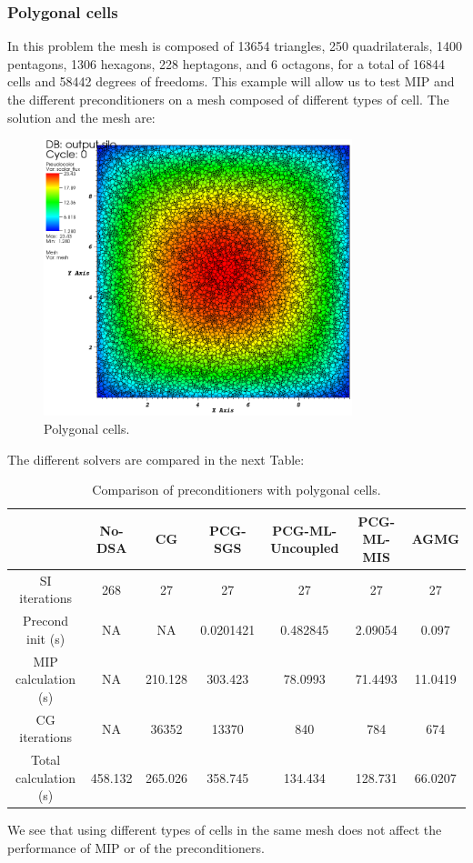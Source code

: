 \subsubsection{Polygonal cells}
In this problem the mesh is composed of 13654 triangles, 250 quadrilaterals,
1400 pentagons, 1306 hexagons, 228 heptagons, and 6 octagons, for a total of
16844 cells and 58442 degrees of freedoms. This example will allow us to test
MIP and the different preconditioners on a mesh composed of different types of
cell. The solution and the mesh are:
\begin{figure}[H]
\centering
\includegraphics[width=0.8\textwidth]{homog_poly_crop}
\caption{Polygonal cells.}
\end{figure}
The different solvers are compared in the next Table:
\begin{table}[H]
\begin{center}
\begin{tabular}{|c|c|c|c|c|c|c|}
\hline
 & No-DSA & CG & PCG-SGS & PCG-ML-Uncoupled & PCG-ML-MIS & AGMG\\
\hline
SI iterations & 268 & 27 & 27 & 27 & 27 & 27\\
Precond init (s) & NA & NA & 0.0201421 & 0.482845 & 2.09054 & 0.097\\
MIP calculation (s) & NA & 210.128 & 303.423 & 78.0993 & 71.4493 & 11.0419\\
CG iterations & NA & 36352 & 13370 & 840 & 784 & 674\\
Total calculation (s) & 458.132 & 265.026 & 358.745 & 134.434 & 128.731 &
66.0207\\
\hline
\end{tabular}
\caption{Comparison of preconditioners with polygonal cells.}
\end{center}
\end{table}
We see that using different types of cells in the same mesh does not affect
the performance of MIP or of the preconditioners. 


